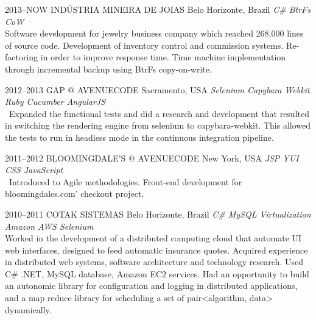 \documentclass[]{friggeri-cv}
\begin{document}
\begin{entrylist}


\entry
{2013--NOW}
{INDÚSTRIA MINEIRA DE JOIAS}
{Belo Horizonte, Brazil}
{\emph{\bullet C\# \bullet BtrFs CoW  } \\ Software development for jewelry business company which reached 268,000 lines of source code. Development of inventory control and commission systems. Re-factoring in order to improve response time. Time machine implementation through incremental backup using BtrFs copy-on-write. }


\entry
{2012--2013}
{GAP @ AVENUECODE}
{Sacramento, USA}
{\emph{\bullet Selenium \bullet Capybara \bullet Webkit \bullet Ruby \bullet Cucumber \bullet AngularJS } \\
\
Expanded the functional tests and did a research and development that resulted in switching the rendering engine from selenium to capybara-webkit. This allowed the tests to run in  headless mode in the continuous integration pipeline.
}


\entry
{2011--2012}
{BLOOMINGDALE'S @ AVENUECODE}
{New York, USA}
{\emph{\bullet JSP \bullet YUI \bullet CSS \bullet JavaScript } \\
\
Introduced to Agile methodologies. Front-end development for bloomingdales.com' checkout project. 
}

\entry
{2010--2011}
{COTAK SISTEMAS}
{Belo Horizonte, Brazil}
{\emph{\bullet C\# \bullet MySQL \bullet Virtualization \bullet Amazon AWS \bullet Selenium } \\ Worked in the development of a distributed computing cloud that automate UI web interfaces, designed to feed automatic insurance quotes. Acquired experience in distributed web systems, software architecture and technology research. Used C\# .NET, MySQL database, Amazon EC2 services. Had an opportunity to build an autonomic library for configuration and logging in distributed applications, and a map reduce library for scheduling a set of pair<algorithm, data> dynamically.
}




\end{entrylist}
\end{document}
